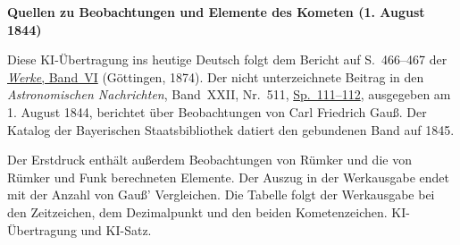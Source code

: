 \clearpage\thispagestyle{empty}
\begin{center}\textbf{Quellen zu Beobachtungen und Elemente des Kometen (1. August 1844)}\end{center}
\noindent Diese KI-Übertragung ins heutige Deutsch folgt dem Bericht auf S.~466--467 der \href{https://gdz.sub.uni-goettingen.de/id/PPN236007467}{\textit{Werke}, Band~VI} (Göttingen, 1874). Der nicht unterzeichnete Beitrag in den \textit{Astronomischen Nachrichten}, Band~XXII, Nr.~511, \href{https://api.digitale-sammlungen.de/iiif/image/v2/bsb10049447_00064/full/1800,/0/default.jpg}{Sp.~111--112}, ausgegeben am 1. August 1844, berichtet über Beobachtungen von Carl Friedrich Gauß. Der Katalog der Bayerischen Staatsbibliothek datiert den gebundenen Band auf 1845.
\par\smallskip\noindent Der Erstdruck enthält außerdem Beobachtungen von Rümker und die von Rümker und Funk berechneten Elemente. Der Auszug in der Werkausgabe endet mit der Anzahl von Gauß’ Vergleichen. Die Tabelle folgt der Werkausgabe bei den Zeitzeichen, dem Dezimalpunkt und den beiden Kometenzeichen. KI-Übertragung und KI-Satz.
\clearpage
